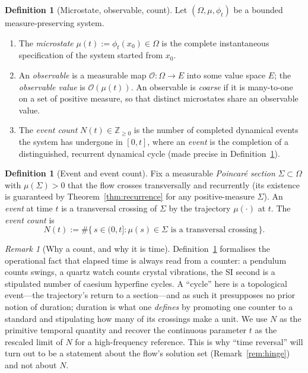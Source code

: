 \documentclass[11pt,a4paper]{article}
\theoremstyle{thmstyle}
\theoremstyle{definition}
\newtheorem{definition}[theorem]{Definition}
\theoremstyle{remark}
\newtheorem{remark}[theorem]{Remark}
\newcommand{\Zp}{\mathbb{Z}_{\geq 0}}
\newcommand{\Mic}{\mu}
\newcommand{\Obs}{\mathcal{O}}
\newcommand{\Count}{N}
\newcommand{\flow}{\phi}
\begin{document}
\begin{definition}[Microstate, observable, count]
\label{def:three}
Let $(\Omega,\mu,\flow_t)$ be a bounded measure-preserving system.
\begin{enumerate}[label=(\roman*),leftmargin=2em]
\item The \emph{microstate} $\Mic(t):=\flow_t(x_0)\in\Omega$ is the
complete instantaneous specification of the system started from $x_0$.
\item An \emph{observable} is a measurable map $\Obs\colon\Omega\to E$
into some value space $E$; the \emph{observable value} is
$\Obs(\Mic(t))$. An observable is \emph{coarse} if it is many-to-one on a
set of positive measure, so that distinct microstates share an observable
value.
\item The \emph{event count} $\Count(t)\in\Zp$ is the number of completed
dynamical events the system has undergone in $[0,t]$, where an
\emph{event} is the completion of a distinguished, recurrent dynamical
cycle (made precise in Definition~\ref{def:event}).
\end{enumerate}
\end{definition}

\begin{definition}[Event and event count]
\label{def:event}
Fix a measurable \emph{Poincar\'e section} $\Sigma\subset\Omega$ with
$\mu(\Sigma)>0$ that the flow crosses transversally and recurrently
(its existence is guaranteed by Theorem~\ref{thm:recurrence} for any
positive-measure $\Sigma$). An \emph{event} at time $t$ is a transversal
crossing of $\Sigma$ by the trajectory $\Mic(\cdot)$ at $t$. The
\emph{event count} is
\begin{equation}
\Count(t):=\#\{\,s\in(0,t] : \Mic(s)\in\Sigma\text{ is a transversal
crossing}\,\}.
\label{eq:count}
\end{equation}
\end{definition}

\begin{remark}[Why a count, and why it is time]
\label{rem:countistime}
Definition~\ref{def:event} formalises the operational fact that elapsed
time is always read from a counter: a pendulum counts swings, a quartz
watch counts crystal vibrations, the SI second is a stipulated number of
caesium hyperfine cycles. A ``cycle'' here is a topological event---the
trajectory's return to a section---and as such it presupposes no prior
notion of duration; duration is what one \emph{defines} by promoting one
counter to a standard and stipulating how many of its crossings make a
unit. We use $\Count$ as the primitive temporal quantity and recover the
continuous parameter $t$ as the rescaled limit of $\Count$ for a
high-frequency reference. This is why ``time reversal'' will turn out to
be a statement about the flow's solution set
(Remark~\ref{rem:hinge}) and not about $\Count$.
\end{remark}
\end{document}
